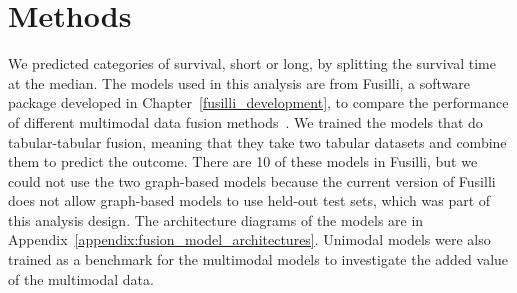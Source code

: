 \section{Methods}

We predicted categories of survival, short or long, by splitting the survival time at the median.
The models used in this analysis are from Fusilli, a software package developed in Chapter~\ref{fusilli_development}, to compare the performance of different multimodal data fusion methods~\cite{townendFlorencejtFusilliFusilli2024}.
We trained the models that do tabular-tabular fusion, meaning that they take two tabular datasets and combine them to predict the outcome.
There are 10 of these models in Fusilli, but we could not use the two graph-based models because the current version of Fusilli does not allow graph-based models to use held-out test sets, which was part of this analysis design.
The architecture diagrams of the models are in Appendix~\ref{appendix:fusion_model_architectures}.
Unimodal models were also trained as a benchmark for the multimodal models to investigate the added value of the multimodal data.


